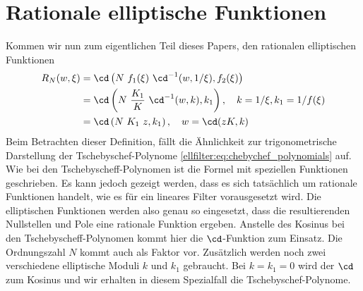\section{Rationale elliptische Funktionen}

Kommen wir nun zum eigentlichen Teil dieses Papers, den rationalen elliptischen Funktionen \cite{ellfilter:bib:orfanidis}
\begin{align}
    R_N(w, \xi) &= \cd \left(N~f_1(\xi)~\cd^{-1}(w, 1/\xi), f_2(\xi)\right) \label{ellfilter:eq:elliptic}\\
                &= \cd \left(N~\frac{K_1}{K}~\cd^{-1}(w, k), k_1\right) , \quad k= 1/\xi, k_1 = 1/f(\xi) \\
                &= \cd \left(N~K_1~z , k_1 \right), \quad w= \cd(z K, k)
\end{align}
Beim Betrachten dieser Definition, fällt die Ähnlichkeit zur trigonometrische Darstellung der Tsche\-byschef-Polynome \eqref{ellfilter:eq:chebychef_polynomials} auf.
Wie bei den Tschebyscheff-Polynomen ist die Formel mit speziellen Funktionen geschrieben.
Es kann jedoch gezeigt werden, dass es sich tatsächlich um rationale Funktionen handelt, wie es für ein lineares Filter vorausgesetzt wird.
Die elliptischen Funktionen werden also genau so eingesetzt, dass die resultierenden Nullstellen und Pole eine rationale Funktion ergeben.
Anstelle des Kosinus bei den Tschebyscheff-Polynomen kommt hier die $\cd$-Funktion zum Einsatz.
Die Ordnungszahl $N$ kommt auch als Faktor vor.
Zusätzlich werden noch zwei verschiedene elliptische Moduli $k$ und $k_1$ gebraucht.
Bei $k = k_1 = 0$ wird der $\cd$ zum Kosinus und wir erhalten in diesem Spezialfall die Tschebyschef-Polynome.

